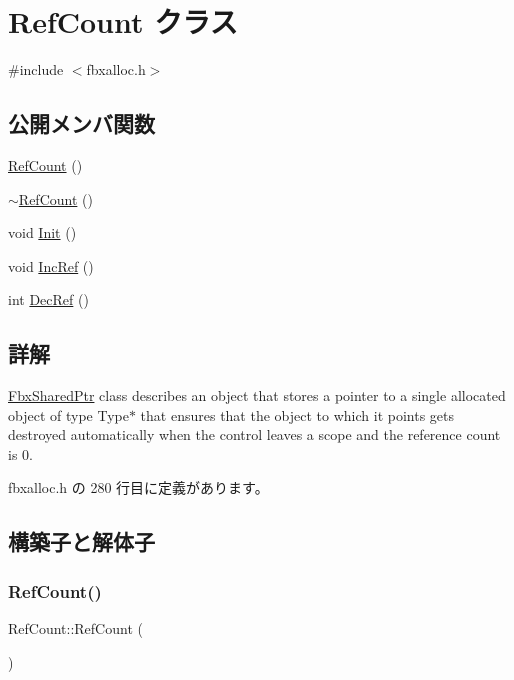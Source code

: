 \hypertarget{class_ref_count}{}\section{Ref\+Count クラス}
\label{class_ref_count}


{\ttfamily \#include $<$fbxalloc.\+h$>$}

\subsection*{公開メンバ関数}
\begin{DoxyCompactItemize}
\item 
\hyperlink{class_ref_count_a871f21de0112bc4ca80b47d81e1be6e4}{Ref\+Count} ()
\item 
\hyperlink{class_ref_count_afa3ff3bce8a9dc9e34ef9c55496c084b}{$\sim$\+Ref\+Count} ()
\item 
void \hyperlink{class_ref_count_af2574bc3b90cd73d040d6bc4b334e2d8}{Init} ()
\item 
void \hyperlink{class_ref_count_abbe1d06e3becee3f3ae61c8d03498a7f}{Inc\+Ref} ()
\item 
int \hyperlink{class_ref_count_a714d52936fdaf707bfc1741942569295}{Dec\+Ref} ()
\end{DoxyCompactItemize}


\subsection{詳解}
\hyperlink{class_fbx_shared_ptr}{Fbx\+Shared\+Ptr} class describes an object that stores a pointer to a single allocated object of type Type$\ast$ that ensures that the object to which it points gets destroyed automatically when the control leaves a scope and the reference count is 0. 

 fbxalloc.\+h の 280 行目に定義があります。



\subsection{構築子と解体子}
\mbox{\label{class_ref_count_a871f21de0112bc4ca80b47d81e1be6e4}} 
\subsubsection{\texorpdfstring{Ref\+Count()}{RefCount()}}
{\footnotesize\ttfamily Ref\+Count\+::\+Ref\+Count (\begin{DoxyParamCaption}{ }\end{DoxyParamCaption})\hspace{0.3cm}{\ttfamily [inline]}}



